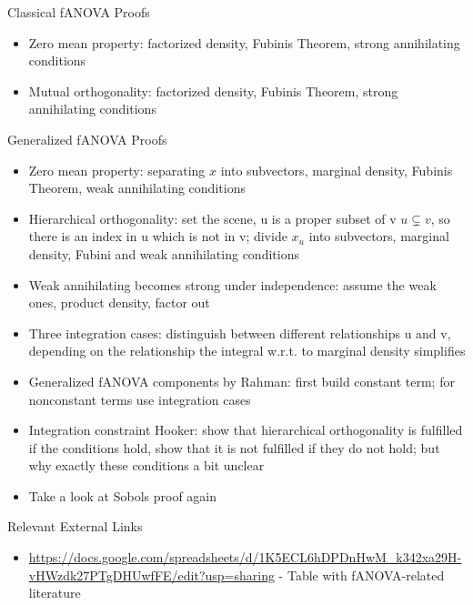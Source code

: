 
\begin{frame}{Classical fANOVA Proofs}
    \begin{itemize}
        \item Zero mean property: factorized density, Fubinis Theorem, strong annihilating conditions
        \item Mutual orthogonality: factorized density, Fubinis Theorem, strong annihilating conditions
    \end{itemize}
\end{frame}

\begin{frame}{Generalized fANOVA Proofs}
    \begin{itemize}
        \item Zero mean property: separating $x$ into subvectors, marginal density, Fubinis Theorem, weak annihilating conditions
        \item Hierarchical orthogonality: set the scene, u is a proper subset of v $u \subsetneq v$, so there is an index in u which is not in v; divide $x_u$ into subvectors, marginal density, Fubini and weak annihilating conditions
        \item Weak annihilating becomes strong under independence: assume the weak ones, product density, factor out
        \item Three integration cases: distinguish between different relationships u and v, depending on the relationship the integral w.r.t. to marginal density simplifies
        \item Generalized fANOVA components by Rahman: first build constant term; for nonconstant terms use integration cases
        \item Integration constraint Hooker: show that hierarchical orthogonality is fulfilled if the conditions hold, show that it is not fulfilled if they do not hold; but why exactly these conditions a bit unclear
        \item Take a look at Sobols proof again
    \end{itemize}
\end{frame}

\begin{frame}{Relevant External Links}
    \begin{itemize}
        \item \url{https://docs.google.com/spreadsheets/d/1K5ECL6hDPDnHwM_k342xa29H-vHWzdk27PTgDHUwfFE/edit?usp=sharing} - Table with fANOVA-related literature
    \end{itemize}
\end{frame}